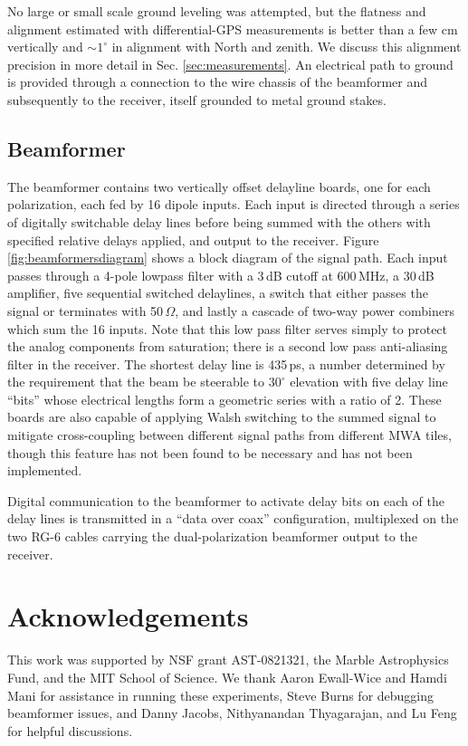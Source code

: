No large or small scale ground leveling was attempted, but the flatness and alignment estimated with  differential-GPS measurements is better than a few cm vertically and $\sim1^\circ$ in alignment with North and zenith. We discuss this alignment precision in more detail in Sec. \ref{sec:measurements}. An electrical path to ground is provided through a connection to the wire chassis of the beamformer and subsequently to the receiver, itself grounded to metal ground stakes.

\subsection{Beamformer}
The beamformer contains two vertically offset delayline boards, one for each polarization, each fed by 16 dipole inputs. Each input is directed through a series of digitally switchable delay lines before being summed with the others with specified relative delays applied, and output to the receiver. Figure \ref{fig:beamformersdiagram} shows a block diagram of the signal path. Each input passes through a 4-pole lowpass filter with a 3\,dB cutoff at 600\,MHz, a 30\,dB amplifier, five sequential switched delaylines, a switch that either passes the signal or terminates with 50\,$\Omega$, and lastly a cascade of two-way power combiners which sum the 16 inputs. Note that this low pass filter serves simply to protect the analog components from saturation; there is a second low pass anti-aliasing filter in the receiver. The shortest delay line is 435\,ps, a number determined by the requirement that the beam be steerable to $30^\circ$ elevation with five delay line ``bits'' whose electrical lengths form a geometric series with a ratio of 2. These boards are also capable of applying Walsh switching to the summed signal to mitigate cross-coupling between different signal paths from different MWA tiles, though this feature has not been found to be necessary and has not been implemented. 

Digital communication to the beamformer to activate delay bits on each of the delay lines is transmitted in a ``data over coax'' configuration, multiplexed on the two RG-6 cables carrying the dual-polarization beamformer output to the receiver. 

\section{Acknowledgements}

This work was supported by NSF grant AST-0821321, the Marble Astrophysics Fund, and the MIT School of Science. We thank Aaron Ewall-Wice and Hamdi Mani for assistance in running these experiments, Steve Burns for debugging beamformer issues, and Danny Jacobs, Nithyanandan Thyagarajan, and Lu Feng for helpful discussions. 

